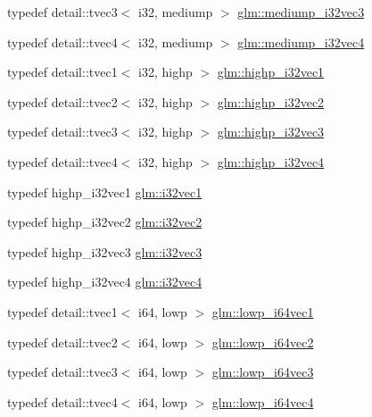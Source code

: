 \begin{DoxyCompactItemize}
\item 
typedef detail\+::tvec3$<$ i32, mediump $>$ \hyperlink{group__gtc__type__precision_ga768e62b66086bd85a438341eedfad651}{glm\+::mediump\+\_\+i32vec3}
\item 
typedef detail\+::tvec4$<$ i32, mediump $>$ \hyperlink{group__gtc__type__precision_ga68126328090f37655d8218c5a5fb8ae5}{glm\+::mediump\+\_\+i32vec4}
\item 
typedef detail\+::tvec1$<$ i32, highp $>$ \hyperlink{group__gtc__type__precision_gadcd58130a48fa561e784a135a88c5d6e}{glm\+::highp\+\_\+i32vec1}
\item 
typedef detail\+::tvec2$<$ i32, highp $>$ \hyperlink{group__gtc__type__precision_ga6020d795076243085eb0d6826c849b4a}{glm\+::highp\+\_\+i32vec2}
\item 
typedef detail\+::tvec3$<$ i32, highp $>$ \hyperlink{group__gtc__type__precision_ga95de80f73e676fb6b9976ff0d33bbc4b}{glm\+::highp\+\_\+i32vec3}
\item 
typedef detail\+::tvec4$<$ i32, highp $>$ \hyperlink{group__gtc__type__precision_ga174af0fafdc5a9eb24150792bffa8b5c}{glm\+::highp\+\_\+i32vec4}
\item 
typedef highp\+\_\+i32vec1 \hyperlink{group__gtc__type__precision_ga0d3741d44591183f3dee9500b4ad9ab4}{glm\+::i32vec1}
\item 
typedef highp\+\_\+i32vec2 \hyperlink{group__gtc__type__precision_gabb9ac4a278f8a8e3a3928dc9bef81089}{glm\+::i32vec2}
\item 
typedef highp\+\_\+i32vec3 \hyperlink{group__gtc__type__precision_ga79a21b299190b6fee673087376753db0}{glm\+::i32vec3}
\item 
typedef highp\+\_\+i32vec4 \hyperlink{group__gtc__type__precision_ga5fea6ade2c848bca1fa55636e75a10b9}{glm\+::i32vec4}
\item 
typedef detail\+::tvec1$<$ i64, lowp $>$ \hyperlink{group__gtc__type__precision_gaf427ced1906a1788fdd9faab2e57c60a}{glm\+::lowp\+\_\+i64vec1}
\item 
typedef detail\+::tvec2$<$ i64, lowp $>$ \hyperlink{group__gtc__type__precision_gad88a04aaa07fabf57fdbad8e6b7bcc9c}{glm\+::lowp\+\_\+i64vec2}
\item 
typedef detail\+::tvec3$<$ i64, lowp $>$ \hyperlink{group__gtc__type__precision_gaa42f666ccdb6d1ef6326882b4f377678}{glm\+::lowp\+\_\+i64vec3}
\item 
typedef detail\+::tvec4$<$ i64, lowp $>$ \hyperlink{group__gtc__type__precision_ga95c13b9d4f94d1783e7d96534d1651d8}{glm\+::lowp\+\_\+i64vec4}
\item 

\end{DoxyCompactItemize}
